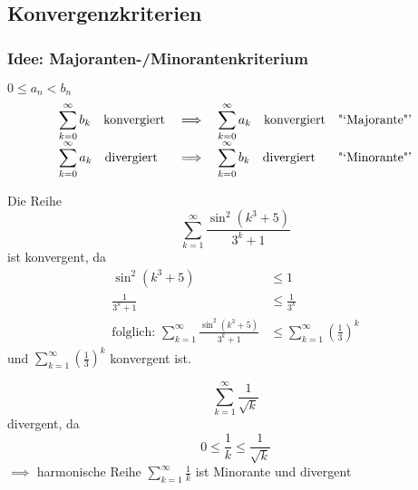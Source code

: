 

\subsection{Konvergenzkriterien}
\subsubsection*{Idee: Majoranten-/Minorantenkriterium}
	
$0 \leq a_n < b_n$
\[
\begin{array}{lcll}
	\displaystyle\sum_{k=0}^{\infty}b_k\quad\text{konvergiert}&\implies&\displaystyle\sum_{k=0}^{\infty} a_k \quad\text{konvergiert} & \text{"`Majorante"'} \\
	\displaystyle\sum_{k=0}^{\infty}a_k \quad\text{divergiert}&\implies&\displaystyle\sum_{k=0}^{\infty} b_k \quad\text{divergiert} & \text{"`Minorante"'}
\end{array}
\]

\begin{example}[Konvergenz]
    Die Reihe \[ \sum_{k=1}^{\infty} \frac{\sin^2 \left( k^3 + 5 \right) }{3^k + 1} \] ist konvergent, da
    \begin{align*}
        \sin^2 \left(k^3 + 5 \right) &\leq 1 \\
        \frac{1}{3^k+1} &\leq \frac{1}{3^k} \\
        \text{folglich: } \sum_{k=1}^{\infty} \frac{\sin^2 \left( k^3 + 5 \right) }{3^k + 1} &\leq \sum_{k=1}^{\infty} \left( \frac{1}{3} \right)^k
    \end{align*}
    und $\sum_{k=1}^{\infty} \left( \frac{1}{3} \right)^k$ konvergent ist.
\end{example}

\begin{example}[Divergenz]
    \begin{equation*}
      \sum_{k=1}^{\infty} \frac{1}{\sqrt{k}}
    \end{equation*}
    divergent, da
    \begin{equation*}
      0 \leq \frac{1}{k} \leq \frac{1}{\sqrt{k}}
    \end{equation*}
    $\implies$ harmonische Reihe $\sum_{k=1}^{\infty} \frac{1}{k}$ ist Minorante und divergent
\end{example}

